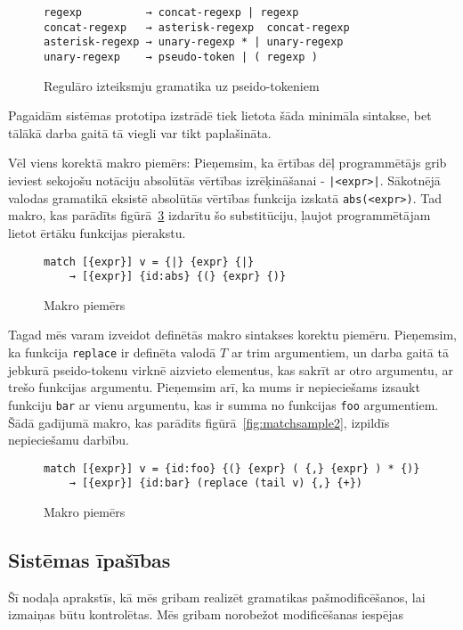 \begin{figure}[h!]
\begin{verbatim}
regexp          → concat-regexp | regexp
concat-regexp   → asterisk-regexp  concat-regexp
asterisk-regexp → unary-regexp * | unary-regexp
unary-regexp    → pseudo-token | ( regexp )
\end{verbatim}
\caption{\label{fig:regexpsyntax}Regulāro izteiksmju gramatika uz pseido-tokeniem}
\end{figure}

Pagaidām sistēmas prototipa izstrādē tiek lietota šāda minimāla sintakse, bet tālākā darba gaitā tā viegli var tikt paplašināta.

Vēl viens korektā makro piemērs: Pieņemsim, ka ērtības dēļ programmētājs grib ieviest sekojošu notāciju absolūtās vērtības izrēķināšanai - \verb/|<expr>|/. Sākotnējā valodas gramatikā eksistē absolūtās vērtības funkcija izskatā \verb|abs(<expr>)|. Tad makro, kas parādīts figūrā~\ref{fig:matchsample1} izdarītu šo substitūciju, ļaujot programmētājam lietot ērtāku funkcijas pierakstu.

\begin{figure}[h!]
\begin{verbatim}
match [{expr}] v = {|} {expr} {|}
    → [{expr}] {id:abs} {(} {expr} {)}
\end{verbatim}
\caption{\label{fig:matchsample1}Makro piemērs}
\end{figure}

Tagad mēs varam izveidot definētās makro sintakses korektu piemēru. Pieņemsim, ka funkcija \verb|replace| ir definēta valodā $T$ ar trim argumentiem, un darba gaitā tā jebkurā pseido-tokenu virknē aizvieto elementus, kas sakrīt ar otro argumentu, ar trešo funkcijas argumentu. Pieņemsim arī, ka mums ir nepieciešams izsaukt funkciju \verb|bar| ar vienu argumentu, kas ir summa no funkcijas \verb|foo| argumentiem. Šādā gadījumā makro, kas parādīts figūrā~\ref{fig:matchsample2}, izpildīs nepieciešamu darbību.

\begin{figure}[h!]
\begin{verbatim}
match [{expr}] v = {id:foo} {(} {expr} ( {,} {expr} ) * {)}
    → [{expr}] {id:bar} (replace (tail v) {,} {+})
\end{verbatim}
\caption{\label{fig:matchsample1}Makro piemērs}
\end{figure}

\subsection{\label{subsec:system_qualities}Sistēmas īpašības}
Šī nodaļa aprakstīs, kā mēs gribam realizēt gramatikas pašmodificēšanos, lai izmaiņas būtu kontrolētas.
Mēs gribam norobežot modificēšanas iespējas

